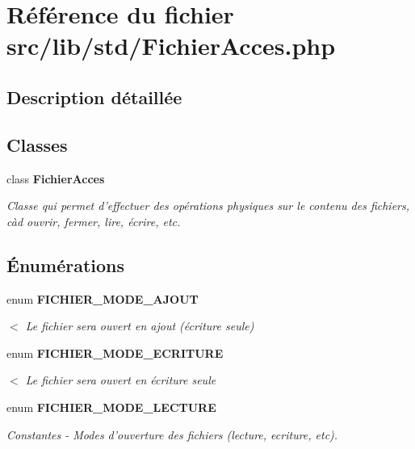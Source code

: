 \section{Référence du fichier src/lib/std/FichierAcces.php}
\label{_fichier_acces_8php}


\subsection{Description détaillée}


\subsection*{Classes}
\begin{CompactItemize}
\item 
class {\bf FichierAcces}
\begin{CompactList}\small\item\em Classe qui permet d'effectuer des opérations physiques sur le contenu des fichiers, càd ouvrir, fermer, lire, écrire, etc. \item\end{CompactList}\end{CompactItemize}
\subsection*{Énumérations}
\begin{Indent}{\bf }\par
\begin{CompactItemize}
\item 
enum {\bf FICHIER\_\-MODE\_\-AJOUT} 
\begin{CompactList}\small\item\em $<$ Le fichier sera ouvert en ajout (écriture seule) \item\end{CompactList}\item 
enum {\bf FICHIER\_\-MODE\_\-ECRITURE} 
\begin{CompactList}\small\item\em $<$ Le fichier sera ouvert en écriture seule \item\end{CompactList}\item 
enum {\bf FICHIER\_\-MODE\_\-LECTURE} 
\begin{CompactList}\small\item\em Constantes - Modes d'ouverture des fichiers (lecture, ecriture, etc). \item\end{CompactList}\end{CompactItemize}
\end{Indent}


